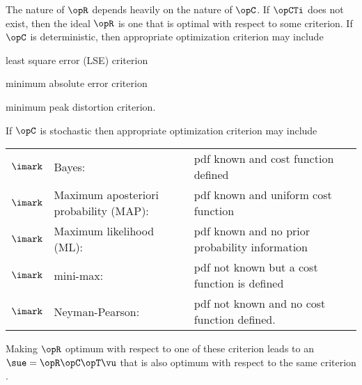 The nature of $\opR$ depends heavily on the nature of $\opC$.
If $\opCTi$ does not exist,
then the ideal $\opR$ is one that is optimal with respect to some criterion.
If $\opC$ is deterministic,
then appropriate optimization criterion may include
\begin{liste}
   \item least square error (LSE) criterion
   \item minimum absolute error criterion
   \item minimum peak distortion criterion.
\end{liste}
If $\opC$ is stochastic
then appropriate optimization criterion may include
\\\begin{tabular}{clll}
     $\imark$ & Bayes:                                  & pdf known and cost function defined
   \\$\imark$ & Maximum aposteriori probability (MAP):  & pdf known and uniform cost function
   \\$\imark$ & Maximum likelihood (ML):                & pdf known and no prior probability information
   \\$\imark$ & mini-max:                               & pdf not known but a cost function is defined
   \\$\imark$ & Neyman-Pearson:                         & pdf not known and no cost function defined.
\end{tabular}

Making $\opR$ optimum with respect to one of these criterion leads to
an  $\sue = \opR\opC\opT\vu$ that is also optimum
with respect to the same criterion .


